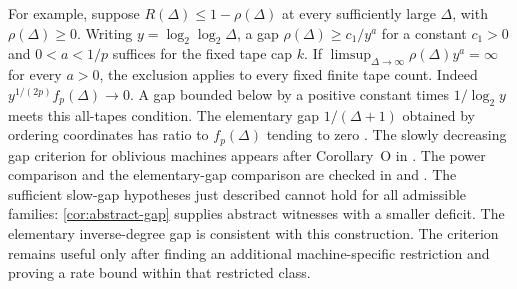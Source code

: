 For example, suppose $R(\Delta)\le1-\rho(\Delta)$ at every sufficiently
large $\Delta$, with $\rho(\Delta)\ge0$. Writing
$y=\log_2\log_2\Delta$, a gap $\rho(\Delta)\ge c_1/y^a$ for a constant
$c_1>0$ and $0<a<1/p$ suffices for the fixed tape cap $k$.
If $\limsup_{\Delta\to\infty}\rho(\Delta)y^a=\infty$ for every $a>0$,
the exclusion applies to every fixed finite tape count. Indeed
$y^{1/(2p)}f_p(\Delta)\to0$. A gap bounded below by a positive
constant times $1/\log_2 y$ meets this all-tapes condition.
The elementary gap $1/(\Delta+1)$ obtained by ordering coordinates
has ratio to $f_p(\Delta)$ tending to zero
\cite[open problems]{PaperThirteen}. The slowly decreasing gap criterion
for oblivious machines appears after Corollary~O in \cite{PaperFourteen}.
The power comparison and the elementary-gap comparison are checked in
 and
.
The sufficient slow-gap hypotheses just described cannot hold for all
admissible families: \cref{cor:abstract-gap} supplies abstract witnesses
with a smaller deficit. The elementary inverse-degree gap is consistent
with this construction. The criterion remains useful only after finding
an additional machine-specific restriction and proving a rate bound
within that restricted class.
